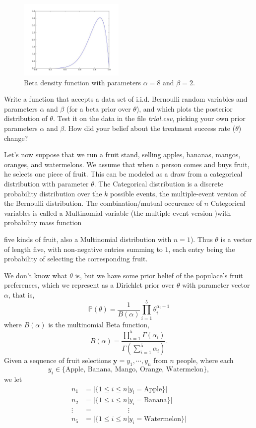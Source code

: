 \begin{figure}[h]
\begin{center}
\includegraphics[height=1.5in]{beta.jpeg}
\end{center}
\caption{Beta density function with parameters $\alpha = 8$ and $\beta = 2$.}
\end{figure}

\begin{problem}
Write a function that accepts a data set of i.i.d. Bernoulli random variables and parameters $\alpha$ and $\beta$ (for a beta prior over $\theta$), and which plots the posterior distribution of $\theta$. Test it on the data in the file \emph{trial.csv}, picking your own prior parameters $\alpha$ and $\beta$. How did your belief about the treatment success rate ($\theta$) change?
\end{problem}

Let's now suppose that we run a fruit stand, selling apples, bananas, mangos, oranges, and watermelons. We assume that when a person comes and buys fruit, he selects one piece of fruit. This can be modeled as a draw from a categorical distribution with parameter $\theta$. The Categorical distribution is a discrete probability distribution over the $k$ possible events, the multiple-event version of the Bernoulli distribution.  The combination/mutual occurence of $n$ Categorical variables is called a Multinomial variable (the multiple-event version )with probability mass function
$$$$

five kinds of fruit, also a Multinomial distribution with $n=1$). Thus $\theta$ is a vector of length five, with non-negative entries summing to $1$, each entry being the probability of selecting the corresponding fruit.

We don't know what $\theta$ is, but we have some prior belief of the populace's fruit preferences, which we represent as a Dirichlet prior over $\theta$ with parameter vector $\alpha$, that is, $$\mathbb{P}(\theta) = \frac{1}{B(\alpha)} \prod_{i=1}^{5} \theta_{i}^{\alpha_{i} - 1}$$ where $B(\alpha)$ is the multinomial Beta function, $$B(\alpha) = \frac{\prod_{i=1}^{5} \Gamma(\alpha_{i})}{\Gamma(\sum_{i=1}^{5} \alpha_{i})}.$$ Given a sequence of fruit selections $\mathbf{y} = y_{1}, \cdots, y_{n}$ from $n$ people, where each $$y_{i} \in \{\text{Apple, Banana, Mango, Orange, Watermelon}\},$$ we let 
\begin{align*}
n_{1} & = |\{1 \leq i \leq n | y_{i} = \text{Apple}\}| \\
n_{2} & = |\{1 \leq i \leq n | y_{i} = \text{Banana}\}| \\
\vdots & = \; \; \; \; \; \; \; \; \; \; \; \; \; \; \; \; \; \; \vdots \\
n_{5} & = |\{1 \leq i \leq n | y_{i} = \text{Watermelon}\}|
\end{align*}

